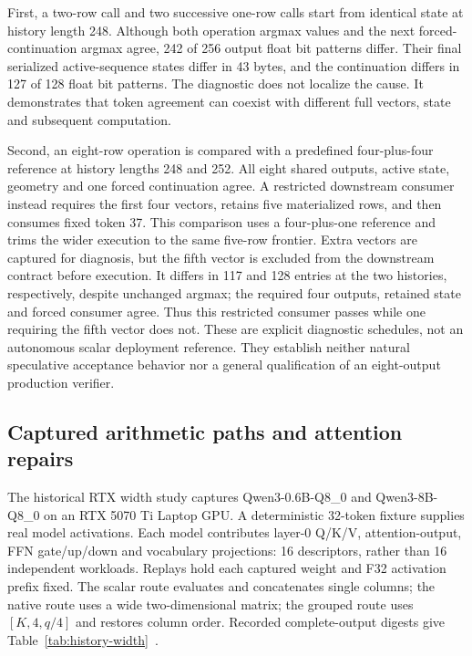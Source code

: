 First, a two-row call and two successive one-row calls start from identical state at history length 248. Although both operation argmax values and the next forced-continuation argmax agree, 242 of 256 output float bit patterns differ. Their final serialized active-sequence states differ in 43 bytes, and the continuation differs in 127 of 128 float bit patterns. The diagnostic does not localize the cause. It demonstrates that token agreement can coexist with different full vectors, state and subsequent computation.

Second, an eight-row operation is compared with a predefined four-plus-four reference at history lengths 248 and 252. All eight shared outputs, active state, geometry and one forced continuation agree. A restricted downstream consumer instead requires the first four vectors, retains five materialized rows, and then consumes fixed token 37. This comparison uses a four-plus-one reference and trims the wider execution to the same five-row frontier. Extra vectors are captured for diagnosis, but the fifth vector is excluded from the downstream contract before execution. It differs in 117 and 128 entries at the two histories, respectively, despite unchanged argmax; the required four outputs, retained state and forced consumer agree. Thus this restricted consumer passes while one requiring the fifth vector does not. These are explicit diagnostic schedules, not an autonomous scalar deployment reference. They establish neither natural speculative acceptance behavior nor a general qualification of an eight-output production verifier.

\subsection{Captured arithmetic paths and attention repairs}
\label{sec:supp-historical-mechanisms}
The historical RTX width study captures Qwen3-0.6B-Q8\_0 and Qwen3-8B-Q8\_0 on an RTX 5070 Ti Laptop GPU. A deterministic 32-token fixture supplies real model activations. Each model contributes layer-0 Q/K/V, attention-output, FFN gate/up/down and vocabulary projections: 16 descriptors, rather than 16 independent workloads. Replays hold each captured weight and F32 activation prefix fixed. The scalar route evaluates and concatenates single columns; the native route uses a wide two-dimensional matrix; the grouped route uses $[K,4,q/4]$ and restores column order. Recorded complete-output digests give Table~\ref{tab:history-width}~\cite{records}.

